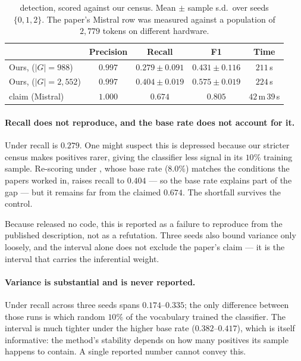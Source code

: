 \begin{table}[h]
\centering
\caption{\gp{} detection, scored against our census. Mean $\pm$ sample s.d.\ over
seeds $\{0,1,2\}$. The paper's Mistral row was measured against a population of
$2{,}779$ tokens on different hardware.}
\label{tab:detect}
\begin{tabular}{lcccc}
\toprule
& Precision & Recall & F1 & Time \\
\midrule
Ours, \Ppaper{} ($|G| = 988$)      & $0.997$ & $0.279 \pm 0.091$ & $0.431 \pm 0.116$ & $211$\,s \\
Ours, \Pcode{} ($|G| = 2{,}552$)   & $0.997$ & $0.404 \pm 0.019$ & $0.575 \pm 0.019$ & $224$\,s \\
\midrule
\gp{} claim (Mistral)              & $1.000$ & $0.674$ & $0.805$ & $42$\,m\,$39$\,s \\
\bottomrule
\end{tabular}
\end{table}

\paragraph{Recall does not reproduce, and the base rate does not account for it.}
Under \Ppaper{} recall is $0.279$. One might suspect this is depressed because our
stricter census makes positives rarer, giving the classifier less signal in its
$10\%$ training sample. Re-scoring under \Pcode{}, whose base rate ($8.0\%$)
matches the conditions the papers worked in, raises recall to $0.404$ --- so the
base rate explains part of the gap --- but it remains far from the claimed
$0.674$. The shortfall survives the control.

Because \gp{} released no code, this is reported as a failure to reproduce from
the published description, not as a refutation. Three seeds also bound variance
only loosely, and the \Ppaper{} interval alone does not exclude the paper's claim
--- it is the \Pcode{} interval that carries the inferential weight.

\paragraph{Variance is substantial and is never reported.} Under \Ppaper{} recall
across three seeds spans $0.174$--$0.335$; the only difference between those runs
is which random $10\%$ of the vocabulary trained the classifier. The interval is
much tighter under the higher base rate ($0.382$--$0.417$), which is itself
informative: the method's stability depends on how many positives its sample
happens to contain. A single reported number cannot convey this.

